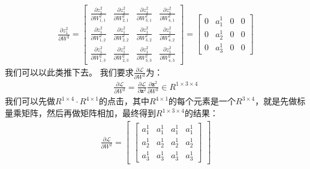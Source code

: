\begin{equation}
\begin{aligned}
\frac{\partial{z^{2}_{1}}} {\partial{W^{2}}} = \begin{bmatrix}
	\frac{\partial{z^{2}_{1}}} {\partial{W^{2}_{1,1}}} & \frac{\partial{z^{2}_{1}}} {\partial{W^{2}_{2,1}}} & \frac{\partial{z^{2}_{1}}} {\partial{W^{2}_{3,1}}} & \frac{\partial{z^{2}_{1}}} {\partial{W^{2}_{4,1}}} \\
	\frac{\partial{z^{2}_{1}}} {\partial{W^{2}_{1,2}}} & \frac{\partial{z^{2}_{1}}} {\partial{W^{2}_{2,2}}} & \frac{\partial{z^{2}_{1}}} {\partial{W^{2}_{3,2}}} & \frac{\partial{z^{2}_{1}}} {\partial{W^{2}_{4,2}}} \\
	\frac{\partial{z^{2}_{1}}} {\partial{W^{2}_{1,3}}} & \frac{\partial{z^{2}_{1}}} {\partial{W^{2}_{2,3}}} & \frac{\partial{z^{2}_{1}}} {\partial{W^{2}_{3,3}}} & \frac{\partial{z^{2}_{1}}} {\partial{W^{2}_{4,3}}} 
\end{bmatrix} = \begin{bmatrix}
	0 & a^{1}_{1} & 0 & 0 \\
	0 & a^{1}_{2} & 0 & 0 \\
	0 & a^{1}_{3} & 0 & 0 
\end{bmatrix}
\end{aligned}
\label{chpZ01-zwa-z21-w2-2-def}
\end{equation}
我们可以以此类推下去。
我们要求$\frac{\partial{ \mathcal{L} }} {\partial{W^{2}}}$为：
\begin{equation}
\begin{aligned}
	\frac{\partial{ \mathcal{L} }} {\partial{W^{2}}} = \frac{\partial{ \mathcal{L} }} {\partial{ \boldsymbol{z}^{2} }} \frac{\partial{ \boldsymbol{z}^{2} }} {\partial{ W^{2} }} \in R^{1 \times 3 \times 4}
\end{aligned}
\label{chpZ01-zwa-pL-pw2-def}
\end{equation}
我们可以先做$R^{1 \times 4} \cdot R^{4 \times 1}$的点击，其中$R^{4 \times 1}$的每个元素是一个$R^{3 \times 4}$，就是先做标量乘矩阵，然后再做矩阵相加，最终得到$R^{1 \times 3 \times 4}$的结果：
\begin{equation}
\begin{aligned}
	\frac{\partial{ \mathcal{L} }} {\partial{W^{2}}} = \begin{bmatrix}
		\begin{bmatrix}
			a^{1}_{1} & a^{1}_{1} & a^{1}_{1} & a^{1}_{1} \\
			a^{1}_{2} & a^{1}_{2} & a^{1}_{2} & a^{1}_{2} \\
			a^{1}_{3} & a^{1}_{3} & a^{1}_{3} & a^{1}_{3}
		\end{bmatrix}
	\end{bmatrix}
\end{aligned}
\label{chpZ01-zwa-pL-pw2-result}
\end{equation}
